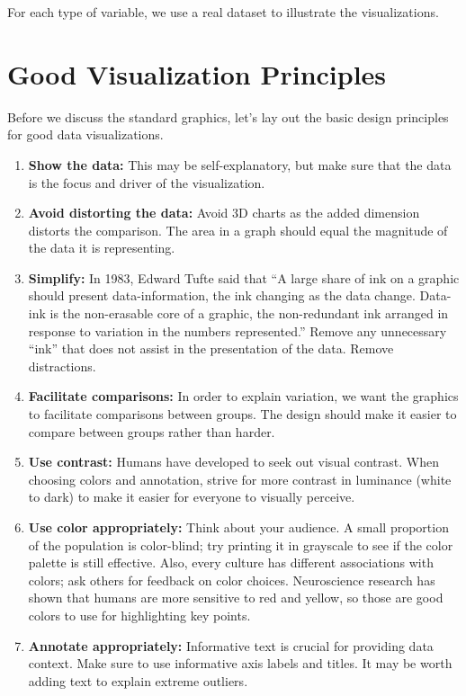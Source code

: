 \documentclass[]{book}
\begin{document}
For each type of variable, we use a real dataset to illustrate the visualizations.

\hypertarget{good-visualization-principles}{%
\section{Good Visualization Principles}\label{good-visualization-principles}}

Before we discuss the standard graphics, let's lay out the basic design principles for good data visualizations.

\begin{enumerate}
\def\labelenumi{\arabic{enumi}.}
\item
  \textbf{Show the data:} This may be self-explanatory, but make sure that the data is the focus and driver of the visualization.
\item
  \textbf{Avoid distorting the data:} Avoid 3D charts as the added dimension distorts the comparison. The area in a graph should equal the magnitude of the data it is representing.
\item
  \textbf{Simplify:} In 1983, Edward Tufte said that ``A large share of ink on a graphic should present data-information, the ink changing as the data change. Data-ink is the non-erasable core of a graphic, the non-redundant ink arranged in response to variation in the numbers represented.'' Remove any unnecessary ``ink'' that does not assist in the presentation of the data. Remove distractions.
\item
  \textbf{Facilitate comparisons:} In order to explain variation, we want the graphics to facilitate comparisons between groups. The design should make it easier to compare between groups rather than harder.
\item
  \textbf{Use contrast:} Humans have developed to seek out visual contrast. When choosing colors and annotation, strive for more contrast in luminance (white to dark) to make it easier for everyone to visually perceive.
\item
  \textbf{Use color appropriately:} Think about your audience. A small proportion of the population is color-blind; try printing it in grayscale to see if the color palette is still effective. Also, every culture has different associations with colors; ask others for feedback on color choices. Neuroscience research has shown that humans are more sensitive to red and yellow, so those are good colors to use for highlighting key points.
\item
  \textbf{Annotate appropriately:} Informative text is crucial for providing data context. Make sure to use informative axis labels and titles. It may be worth adding text to explain extreme outliers.
\end{enumerate}
\end{document}
